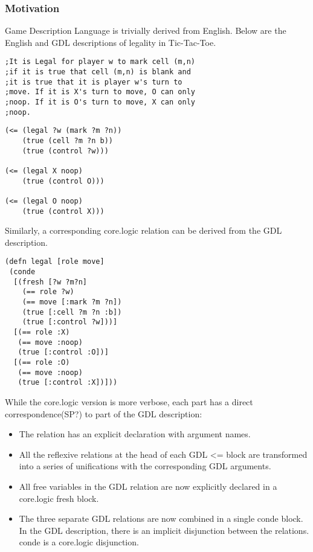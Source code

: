 \documentclass[letterpaper]{article}
\begin{document}
\subsubsection{Motivation}
Game Description Language is trivially derived from English. Below are the English and GDL descriptions of legality in Tic-Tac-Toe.
\begin{lstlisting}[frame=single, caption=The Legal relation for Tic-Tac-Toe expressed in English]
;It is Legal for player w to mark cell (m,n)
;if it is true that cell (m,n) is blank and
;it is true that it is player w's turn to
;move. If it is X's turn to move, O can only
;noop. If it is O's turn to move, X can only
;noop. 
\end{lstlisting}
\begin{lstlisting}[frame=single, caption=The Legal relation for Tic-Tac-Toe expressed in GDL]
(<= (legal ?w (mark ?m ?n))
    (true (cell ?m ?n b))
    (true (control ?w)))

(<= (legal X noop)
    (true (control O)))

(<= (legal O noop)
    (true (control X)))
\end{lstlisting}

Similarly, a corresponding core.logic relation can be derived from the GDL description.

\begin{lstlisting}[frame=single, caption=The Legal relation translated into core.logic]
(defn legal [role move]
 (conde
  [(fresh [?w ?m?n]
    (== role ?w)
    (== move [:mark ?m ?n])
    (true [:cell ?m ?n :b])
    (true [:control ?w]))]
  [(== role :X)
   (== move :noop)
   (true [:control :O])]
  [(== role :O)
   (== move :noop)
   (true [:control :X])]))
\end{lstlisting}

While the core.logic version is more verbose, each part has a direct correspondence(SP?) to part of the GDL description:
\begin{itemize}
\item The relation has an explicit declaration with argument names.
\item All the reflexive relations at the head of each GDL \textless= block are transformed into a series of unifications with the corresponding GDL arguments. 
\item All free variables in the GDL relation are now explicitly declared in a core.logic fresh block.
\item The three separate GDL relations are now combined in a single conde block. In the GDL description, there is an implicit disjunction between the relations. conde is a core.logic disjunction.
\end{itemize}
\end{document}
